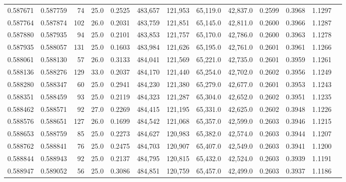 \begin{tabular}{rrrrrrrrrrrrr}
0.587671 & 0.587759 &    74 & 25.0 &                                     0.2525 & 483,657 & 121,953 &  65,119.0 &  42,837.0 & 0.2599 & 0.3968 & 1.1297 \\
0.587764 & 0.587874 &   102 & 26.0 &                                     0.2031 & 483,759 & 121,851 &  65,145.0 &  42,811.0 & 0.2600 & 0.3966 & 1.1287 \\
0.587880 & 0.587935 &    94 & 25.0 &                                     0.2101 & 483,853 & 121,757 &  65,170.0 &  42,786.0 & 0.2600 & 0.3963 & 1.1278 \\
0.587935 & 0.588057 &   131 & 25.0 &                                     0.1603 & 483,984 & 121,626 &  65,195.0 &  42,761.0 & 0.2601 & 0.3961 & 1.1266 \\
0.588061 & 0.588130 &    57 & 26.0 &                                     0.3133 & 484,041 & 121,569 &  65,221.0 &  42,735.0 & 0.2601 & 0.3959 & 1.1261 \\
0.588136 & 0.588276 &   129 & 33.0 &                                     0.2037 & 484,170 & 121,440 &  65,254.0 &  42,702.0 & 0.2602 & 0.3956 & 1.1249 \\
0.588280 & 0.588347 &    60 & 25.0 &                                     0.2941 & 484,230 & 121,380 &  65,279.0 &  42,677.0 & 0.2601 & 0.3953 & 1.1243 \\
0.588351 & 0.588459 &    93 & 25.0 &                                     0.2119 & 484,323 & 121,287 &  65,304.0 &  42,652.0 & 0.2602 & 0.3951 & 1.1235 \\
0.588462 & 0.588571 &    92 & 27.0 &                                     0.2269 & 484,415 & 121,195 &  65,331.0 &  42,625.0 & 0.2602 & 0.3948 & 1.1226 \\
0.588576 & 0.588651 &   127 & 26.0 &                                     0.1699 & 484,542 & 121,068 &  65,357.0 &  42,599.0 & 0.2603 & 0.3946 & 1.1215 \\
0.588653 & 0.588759 &    85 & 25.0 &                                     0.2273 & 484,627 & 120,983 &  65,382.0 &  42,574.0 & 0.2603 & 0.3944 & 1.1207 \\
0.588762 & 0.588841 &    76 & 25.0 &                                     0.2475 & 484,703 & 120,907 &  65,407.0 &  42,549.0 & 0.2603 & 0.3941 & 1.1200 \\
0.588844 & 0.588943 &    92 & 25.0 &                                     0.2137 & 484,795 & 120,815 &  65,432.0 &  42,524.0 & 0.2603 & 0.3939 & 1.1191 \\
0.588947 & 0.589052 &    56 & 25.0 &                                     0.3086 & 484,851 & 120,759 &  65,457.0 &  42,499.0 & 0.2603 & 0.3937 & 1.1186 \\

\end{tabular}
